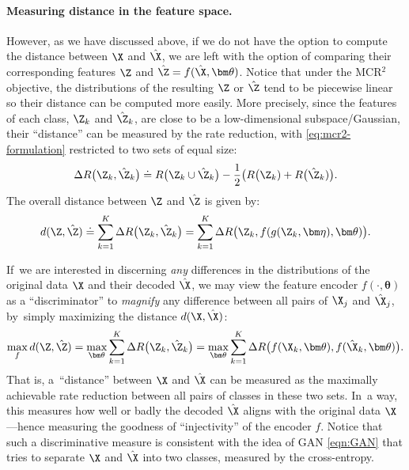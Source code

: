 \documentclass[../../book-main.tex]{subfiles}
\begin{document}
{\paragraph{Measuring distance in the feature space.}
However, as we have discussed above, if we do not have the option to compute the distance between $\X$ and $\hat \X$, we are left with the option of comparing their corresponding features $\Z$ and $\hat \Z = f(\hat \X, \bm \theta)$. Notice that under the MCR$^2$ objective, the distributions of the resulting $\Z$ or $\hat \Z$ tend to be piecewise linear so  their distance can be  computed more easily. More precisely, since the features of each class, $\Z_k$ and $\hat{\Z}_k$, are close to be a low-dimensional subspace/Gaussian, their ``distance'' can be measured by the rate reduction, {with \eqref{eq:mcr2-formulation} restricted to two sets of equal size}:
\begin{equation}
\Delta R\big(\Z_k, \hat{\Z}_k\big) \doteq R\big(\Z_k \cup \hat{\Z}_k\big) - \frac{1}{2} \big( R\big(\Z_k) + R\big(\hat \Z_k)\big).
\end{equation}
The overall distance between $\Z$ and $\hat \Z$ is given by:
\begin{equation}
d(\Z, \hat \Z) \doteq   \sum_{k=1}^K \Delta R\big(\Z_k, \hat{\Z}_k\big) =  \sum_{k=1}^K \Delta R\big(\Z_k, f(g(\Z_k, \bm\eta),\bm \theta)\big).
\label{eqn:Z-distance}
\end{equation}


If~we are interested in discerning {\em any} differences in the distributions of the original data $\X$ and their decoded $\hat \X$, we may view the feature encoder $f(\cdot, \bm \theta)$ as a ``discriminator'' to {\em magnify} any difference between all pairs of $\X_j$ and $\hat \X_j$, by~simply maximizing the distance $d(\X, \hat \X)$:
\begin{equation}
\max_f d(\Z, \hat \Z) = \max_{\bm \theta} \sum_{k=1}^K \Delta R\big(\Z_k, \hat{\Z}_k\big) = \max_{\bm \theta} \sum_{k=1}^K \Delta R\big(f(\X_k,\bm \theta), f(\hat{\X}_k,\bm \theta)\big).
    \label{eqn:max-distance}
\end{equation}
That is, a~``distance'' between $\X$ and $\hat \X$ can be measured as the maximally achievable rate reduction between all pairs of classes in these two sets. In~a way, this measures how well or badly the decoded $\hat \X$ aligns with the original data $\X$---hence measuring the goodness of ``injectivity'' of the encoder $f$. Notice that such a discriminative measure is consistent with the idea of GAN \eqref{eqn:GAN} that tries to separate $\X$ and $\hat \X$ into two classes, measured by the cross-entropy. 

}
\end{document}
